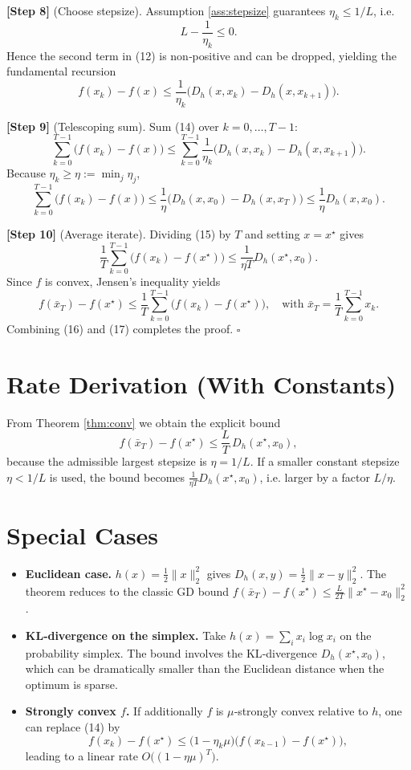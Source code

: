 \documentclass{article}
\newcommand{\Breg}[2]{D_{h}(#1,#2)}
\begin{document}
\noindent\textbf{[Step 8]} (Choose stepsize).  
Assumption \ref{ass:stepsize} guarantees $\eta_{k}\le 1/L$, i.e.
\[
L-\frac{1}{\eta_{k}}\le0.
\tag{13}
\]
Hence the second term in (12) is non‑positive and can be dropped, yielding the fundamental recursion
\[
f(x_{k})-f(x)\le\frac{1}{\eta_{k}}\big(\Breg{x}{x_{k}}-\Breg{x}{x_{k+1}}\big).
\tag{14}
\]

\noindent\textbf{[Step 9]} (Telescoping sum).  
Sum (14) over $k=0,\dots,T-1$:
\[
\sum_{k=0}^{T-1}\bigl(f(x_{k})-f(x)\bigr)
\le
\sum_{k=0}^{T-1}\frac{1}{\eta_{k}}\big(\Breg{x}{x_{k}}-\Breg{x}{x_{k+1}}\big).
\]
Because $\eta_{k}\ge\eta:=\min_{j}\eta_{j}$,
\[
\sum_{k=0}^{T-1}\bigl(f(x_{k})-f(x)\bigr)
\le
\frac{1}{\eta}\big(\Breg{x}{x_{0}}-\Breg{x}{x_{T}}\big)
\le\frac{1}{\eta}\Breg{x}{x_{0}}.
\tag{15}
\]

\noindent\textbf{[Step 10]} (Average iterate).  
Dividing (15) by $T$ and setting $x=x^{\star}$ gives
\[
\frac{1}{T}\sum_{k=0}^{T-1}\bigl(f(x_{k})-f(x^{\star})\bigr)
\le\frac{1}{\eta T}\Breg{x^{\star}}{x_{0}}.
\tag{16}
\]
Since $f$ is convex, Jensen’s inequality yields
\[
f(\bar x_{T})-f(x^{\star})\le\frac{1}{T}\sum_{k=0}^{T-1}\bigl(f(x_{k})-f(x^{\star})\bigr),
\quad\text{with }\bar x_{T}=\frac{1}{T}\sum_{k=0}^{T-1}x_{k}.
\tag{17}
\]
Combining (16) and (17) completes the proof. \hfill $\square$

\section*{Rate Derivation (With Constants)}
From Theorem \ref{thm:conv} we obtain the explicit bound
\[
f(\bar x_{T})-f(x^{\star})\le
\frac{L}{T}\,\Breg{x^{\star}}{x_{0}},
\]
because the admissible largest stepsize is $\eta=1/L$. If a smaller constant stepsize $\eta<1/L$ is used, the bound becomes $\frac{1}{\eta T}\Breg{x^{\star}}{x_{0}}$, i.e. larger by a factor $L/\eta$.

\section*{Special Cases}
\begin{itemize}
    \item \textbf{Euclidean case.} $h(x)=\tfrac12\|x\|_{2}^{2}$ gives $\Breg{x}{y}=\tfrac12\|x-y\|_{2}^{2}$. The theorem reduces to the classic GD bound $f(\bar x_{T})-f(x^{\star})\le\frac{L}{2T}\|x^{\star}-x_{0}\|_{2}^{2}$.
    \item \textbf{KL‑divergence on the simplex.} Take $h(x)=\sum_{i}x_{i}\log x_{i}$ on the probability simplex. The bound involves the KL‑divergence $\Breg{x^{\star}}{x_{0}}$, which can be dramatically smaller than the Euclidean distance when the optimum is sparse.
    \item \textbf{Strongly convex $f$.} If additionally $f$ is $\mu$‑strongly convex relative to $h$, one can replace (14) by
    \[
        f(x_{k})-f(x^{\star})\le\bigl(1-\eta_{k}\mu\bigr)\bigl(f(x_{k-1})-f(x^{\star})\bigr),
    \]
    leading to a linear rate $O\!\big((1-\eta\mu)^{T}\big)$.
\end{itemize}
\end{document}
